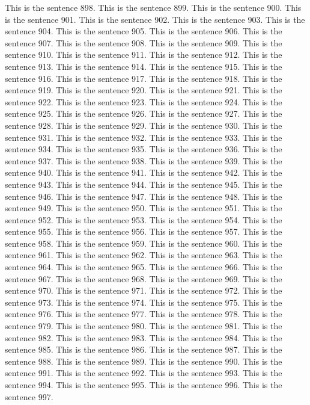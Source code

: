 \documentclass{article}
\begin{document}
This is the sentence 898.
This is the sentence 899.
This is the sentence 900.
This is the sentence 901.
This is the sentence 902.
This is the sentence 903.
This is the sentence 904.
This is the sentence 905.
This is the sentence 906.
This is the sentence 907.
This is the sentence 908.
This is the sentence 909.
This is the sentence 910.
This is the sentence 911.
This is the sentence 912.
This is the sentence 913.
This is the sentence 914.
This is the sentence 915.
This is the sentence 916.
This is the sentence 917.
This is the sentence 918.
This is the sentence 919.
This is the sentence 920.
This is the sentence 921.
This is the sentence 922.
This is the sentence 923.
This is the sentence 924.
This is the sentence 925.
This is the sentence 926.
This is the sentence 927.
This is the sentence 928.
This is the sentence 929.
This is the sentence 930.
This is the sentence 931.
This is the sentence 932.
This is the sentence 933.
This is the sentence 934.
This is the sentence 935.
This is the sentence 936.
This is the sentence 937.
This is the sentence 938.
This is the sentence 939.
This is the sentence 940.
This is the sentence 941.
This is the sentence 942.
This is the sentence 943.
This is the sentence 944.
This is the sentence 945.
This is the sentence 946.
This is the sentence 947.
This is the sentence 948.
This is the sentence 949.
This is the sentence 950.
This is the sentence 951.
This is the sentence 952.
This is the sentence 953.
This is the sentence 954.
This is the sentence 955.
This is the sentence 956.
This is the sentence 957.
This is the sentence 958.
This is the sentence 959.
This is the sentence 960.
This is the sentence 961.
This is the sentence 962.
This is the sentence 963.
This is the sentence 964.
This is the sentence 965.
This is the sentence 966.
This is the sentence 967.
This is the sentence 968.
This is the sentence 969.
This is the sentence 970.
This is the sentence 971.
This is the sentence 972.
This is the sentence 973.
This is the sentence 974.
This is the sentence 975.
This is the sentence 976.
This is the sentence 977.
This is the sentence 978.
This is the sentence 979.
This is the sentence 980.
This is the sentence 981.
This is the sentence 982.
This is the sentence 983.
This is the sentence 984.
This is the sentence 985.
This is the sentence 986.
This is the sentence 987.
This is the sentence 988.
This is the sentence 989.
This is the sentence 990.
This is the sentence 991.
This is the sentence 992.
This is the sentence 993.
This is the sentence 994.
This is the sentence 995.
This is the sentence 996.
This is the sentence 997.
\end{document}
